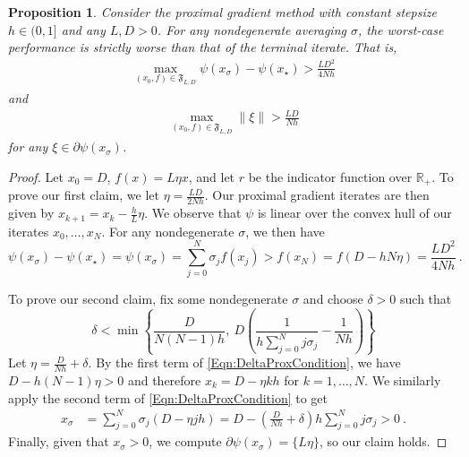 \documentclass[11pt]{article}
\numberwithin{equation}{section}
\newcommand{\R}{\mathbb{R}}
\newtheorem{proposition}[thm]{Proposition}
\theoremstyle{definition}
\theoremstyle{definition}
\theoremstyle{definition}
\newcommand{\1}{\mathbf{1}}
\newcommand{\xStar}{x_\star}
\newcommand{\xSpecial}{x_\sigma}
\begin{document}
    \begin{proposition}
    Consider the proximal gradient method with constant stepsize $h \in (0,1]$ and any $L,D>0$. For any nondegenerate averaging $\sigma$, the worst-case performance is strictly worse than that of the terminal iterate. That is,
        \begin{align*}
            \max_{(x_0,f)\in \mathfrak{F}_{L,D}} \psi(\xSpecial) - \psi(\xStar) > \frac{LD^2}{4Nh}
        \end{align*}
        and
        \begin{align*}
            \max_{(x_0,f)\in \mathfrak{F}_{L,D}} \|\xi\| > \frac{LD}{Nh}
        \end{align*}
        for any $\xi \in \partial \psi(\xSpecial)$.
    \end{proposition}

    \begin{proof}
        Let $x_0 = D$, $f(x) = L \eta x$, and let $r$ be the indicator function over $\R_+$.
        To prove our first claim, we let $\eta = \frac{LD}{2Nh}$. Our proximal gradient iterates are then given by $x_{k+1} = x_k - \frac{h}{L} \eta$. We observe that $\psi$ is linear over the convex hull of our iterates $x_0, \dots, x_N$. For any nondegenerate $\sigma$, we then have
        \begin{equation*}
            \psi(\xSpecial) - \psi(\xStar) = \psi(\xSpecial) = \sum_{j=0}^N \sigma_j f(x_j) > f(x_N) = f(D - hN\eta) = \frac{LD^2}{4Nh} \ .
        \end{equation*}

        To prove our second claim, fix some nondegenerate $\sigma$ and choose $\delta>0$ such that 
        \begin{equation} \label{Eqn:DeltaProxCondition}
            \delta <  \min \left\{\frac{D}{N(N-1)h}, \ D \left(\frac{1}{h\sum_{j=0}^N j \sigma_j} - \frac{1}{Nh}\right) \right\}
        \end{equation}
        Let $\eta = \frac{D}{Nh} + \delta$. By the first term of \eqref{Eqn:DeltaProxCondition}, we have $D - h(N-1)\eta > 0$ and therefore $x_k = D - \eta kh$ for $k = 1,\dots, N$.
        We similarly apply the second term of \eqref{Eqn:DeltaProxCondition} to get
        \begin{align*}
            \xSpecial & = \sum_{j=0}^N \sigma_j (D - \eta jh) =  D- \left(\frac{D}{Nh} +\delta\right) h \sum_{j=0}^N j \sigma_j > 0 \ . 
        \end{align*}
        Finally, given that $\xSpecial > 0$, we compute $\partial \psi(x_\sigma) = \{ L\eta \}$, so our claim holds. 
    \end{proof}
\end{document}
